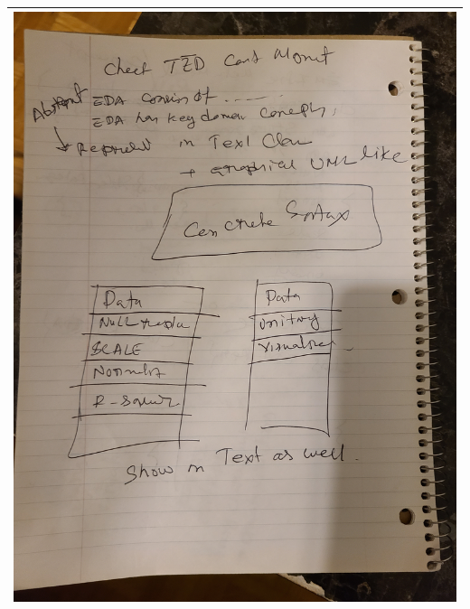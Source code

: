 \begin{tabular}{|c|}
\includegraphics[scale=0.1, angle = -90]{sketch/6.jpg} \\
\hline
\end{tabular}


